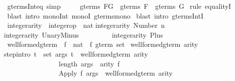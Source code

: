 \begin{isabellebody}
\ gterms{\isacharunderscore}Int{\isacharunderscore}eq\ {\isacharbrackleft}simp{\isacharbrackright}{\isacharcolon}\isanewline
\ \ \ \ \ {\isachardoublequote}gterms\ {\isacharparenleft}F{\isasyminter}G{\isacharparenright}\ {\isacharequal}\ gterms\ F\ {\isasyminter}\ gterms\ G{\isachardoublequote}\isanewline
{}\ {\isacharparenleft}rule\ equalityI{\isacharparenright}\isanewline
{}\ {\isacharparenleft}blast\ intro{\isacharbang}{\isacharcolon}\ mono{\isacharunderscore}Int\ monoI\ gterms{\isacharunderscore}mono{\isacharparenright}\isanewline
{}\ {\isacharparenleft}blast\ intro{\isacharbang}{\isacharcolon}\ gterms{\isacharunderscore}IntI{\isacharparenright}\isanewline
{}\isanewline
\isanewline
\isanewline
{}\ integer{\isacharunderscore}arity\ {\isacharcolon}{\isacharcolon}\ {\isachardoublequote}integer{\isacharunderscore}op\ {\isasymRightarrow}\ nat{\isachardoublequote}\isanewline
{}\isanewline
{\isachardoublequote}integer{\isacharunderscore}arity\ {\isacharparenleft}Number\ n{\isacharparenright}\ \ \ \ \ \ \ \ {\isacharequal}\ {\isacharhash}{}{\isachardoublequote}\isanewline
{\isachardoublequote}integer{\isacharunderscore}arity\ UnaryMinus\ \ \ \ \ \ \ \ {\isacharequal}\ {\isacharhash}{}{\isachardoublequote}\isanewline
{\isachardoublequote}integer{\isacharunderscore}arity\ Plus\ \ \ \ \ \ \ \ \ \ \ \ \ \ {\isacharequal}\ {\isacharhash}{}{\isachardoublequote}\isanewline
\isanewline
{}\ well{\isacharunderscore}formed{\isacharunderscore}gterm\ {\isacharcolon}{\isacharcolon}\ {\isachardoublequote}{\isacharparenleft}{\isacharprime}f\ {\isasymRightarrow}\ nat{\isacharparenright}\ {\isasymRightarrow}\ {\isacharprime}f\ gterm\ set{\isachardoublequote}\isanewline
{}\ {\isachardoublequote}well{\isacharunderscore}formed{\isacharunderscore}gterm\ arity{\isachardoublequote}\isanewline
{}\isanewline
step{\isacharbrackleft}intro{\isacharbang}{\isacharbrackright}{\isacharcolon}\ {\isachardoublequote}{\isasymlbrakk}{\isasymforall}t\ {\isasymin}\ set\ args{\isachardot}\ t\ {\isasymin}\ well{\isacharunderscore}formed{\isacharunderscore}gterm\ arity{\isacharsemicolon}\ \ \isanewline
\ \ \ \ \ \ \ \ \ \ \ \ \ \ \ \ length\ args\ {\isacharequal}\ arity\ f{\isasymrbrakk}\isanewline
\ \ \ \ \ \ \ \ \ \ \ \ \ \ \ {\isasymLongrightarrow}\ {\isacharparenleft}Apply\ f\ args{\isacharparenright}\ {\isasymin}\ well{\isacharunderscore}formed{\isacharunderscore}gterm\ arity{\isachardoublequote}\isanewline

\end{isabellebody}
